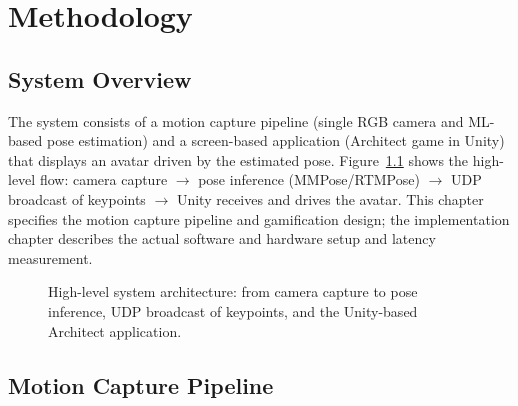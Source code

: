 
\chapter{Methodology}\label{ch:methodology}

\section{System Overview}

The system consists of a motion capture pipeline (single RGB camera and ML-based pose estimation) and a screen-based application (Architect game in Unity) that displays an avatar driven by the estimated pose. Figure~\ref{fig:system-architecture} shows the high-level flow: camera capture $\rightarrow$ pose inference (MMPose/RTMPose) $\rightarrow$ UDP broadcast of keypoints $\rightarrow$ Unity receives and drives the avatar. This chapter specifies the motion capture pipeline and gamification design; the implementation chapter describes the actual software and hardware setup and latency measurement.

\begin{figure}[htbp]
  \centering
  \caption{High-level system architecture: from camera capture to pose inference, UDP broadcast of keypoints, and the Unity-based Architect application.}
  \label{fig:system-architecture}
\end{figure}

\section{Motion Capture Pipeline}\label{sec:motion-capture}

